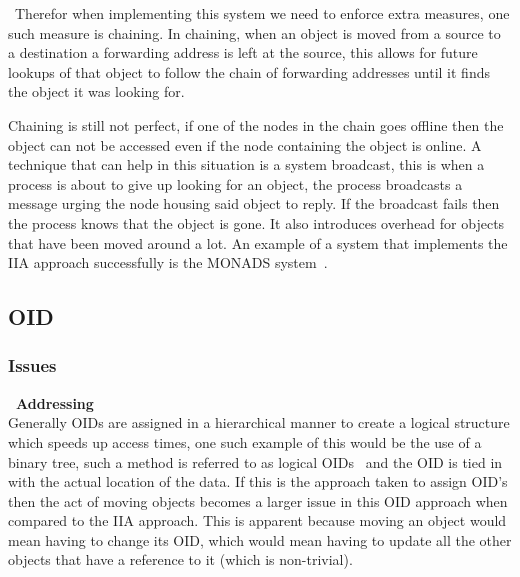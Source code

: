 \documentclass[a4paper,12pt]{article}
\begin{document}
\noindent~Therefor when implementing this system we need to enforce extra measures, one such measure is chaining. 
In chaining, when an object is moved from a source to a destination a forwarding address is left at the source, this allows for future lookups of that object to follow the chain of forwarding addresses until it finds the object it was looking for.

Chaining is still not perfect, if one of the nodes in the chain goes offline then the object can not be accessed even if the node containing the object is online. A technique that can help in this situation is a system broadcast, this is when a process is about to give up looking for an object, the process broadcasts a message urging the node housing said object to reply. If the broadcast fails then the process knows that the object is gone.
It also introduces overhead for objects that have been moved around a lot.
An example of a system that implements the IIA approach successfully is the MONADS system~\citep{moved-modules-in-monads}.

\subsection*{OID}

\subsubsection*{Issues}
\par\textbf{\indent~Addressing}\\
Generally OIDs are assigned in a hierarchical manner to create a logical structure which speeds up access times, one such example of this would be the use of a binary tree, such a method is referred to as logical OIDs~\citep{oid} and the OID is tied in with the actual location of the data.
If this is the approach taken to assign OID's then the act of moving objects becomes a larger issue in this OID approach when compared to the IIA approach.
This is apparent because moving an object would mean having to change its OID, which would mean having to update all the other objects that have a reference to it (which is non-trivial). 
\end{document}

